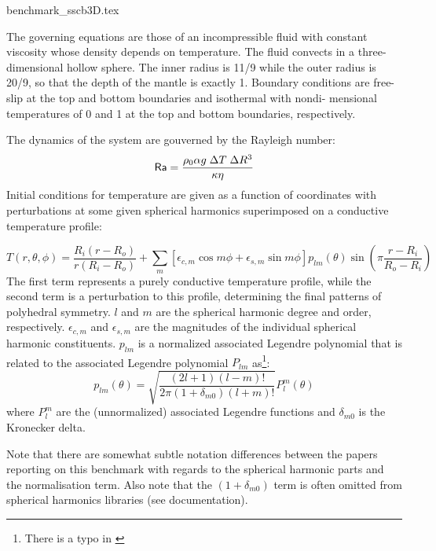 \begin{flushright} {\tiny {\color{gray} benchmark\_sscb3D.tex}} \end{flushright}


The governing equations are those of an incompressible fluid with constant viscosity whose 
density depends on temperature. The fluid convects in a three-dimensional hollow sphere. 
The inner radius is 11/9 while the outer radius is 20/9, so that the depth of the mantle is exactly 1.
Boundary conditions are free-slip at the top
and bottom boundaries and isothermal with nondi-
mensional temperatures of 0 and 1 at the top and
bottom boundaries, respectively.

The dynamics of the system are gouverned by the Rayleigh number:
\[
{\mathsf{Ra}}=\frac{\rho_0 \alpha g \; \Delta T \; \Delta R^3 }{\kappa \eta}
\]
Initial conditions for temperature are given as a function
of coordinates with perturbations at some given
spherical harmonics superimposed on a conductive
temperature profile:

\[
T(r,\theta,\phi)
=\frac{R_i(r-R_o)}{r(R_i-R_o)} 
+
\sum_m
\left[
\epsilon_{c,m} \cos m\phi + \epsilon_{s,m} \sin m\phi
\right]
p_{lm}(\theta) \sin\left( \pi \frac{r-R_i}{R_o-R_i}  \right)
\]
The first term represents a purely conductive temperature profile, while the second term 
is a perturbation to this profile, determining the final patterns of polyhedral symmetry. 
$l$ and $m$ are the spherical harmonic degree and order, respectively.
$\epsilon_{c,m}$ and $\epsilon_{s,m}$ are the magnitudes of the
individual spherical harmonic constituents.
$p_{lm}$ is a normalized associated Legendre
polynomial that is related to the associated
Legendre polynomial $P_{lm}$ as\footnote{There is a typo in \cite{shpe15}}:
\[
p_{lm}(\theta) 
= \sqrt{ \frac{(2l+1)(l-m)!}{2\pi (1+\delta_{m0})(l+m)!}  } P_l^m(\theta) 
\]
where $P_l^m$ are the (unnormalized) associated Legendre functions and  $\delta_{m0}$ 
is the Kronecker delta.

Note that there are somewhat subtle notation differences between the 
papers reporting on this benchmark with regards to the spherical 
harmonic parts and the normalisation term. 
Also note that the $(1+\delta_{m0})$ term is often omitted from 
spherical harmonics libraries (see \aspect documentation). 



